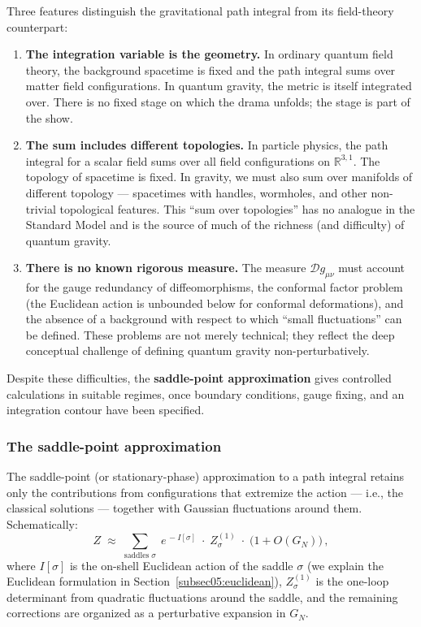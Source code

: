 \documentclass[11pt,letterpaper]{article}
\theoremstyle{plain}
\theoremstyle{definition}
\theoremstyle{remark}
\begin{document}
Three features distinguish the gravitational path integral from its field-theory
counterpart:

\begin{enumerate}
  \item \textbf{The integration variable is the geometry.}  In ordinary quantum
    field theory, the background spacetime is fixed and the path integral sums
    over matter field configurations.  In quantum gravity, the metric is itself
    integrated over.  There is no fixed stage on which the drama unfolds; the
    stage is part of the show.

  \item \textbf{The sum includes different topologies.}  In particle physics, the
    path integral for a scalar field sums over all field configurations on
    $\mathbb{R}^{3,1}$.  The topology of spacetime is fixed.  In gravity, we must
    also sum over manifolds of different topology --- spacetimes with handles,
    wormholes, and other non-trivial topological features.  This ``sum over
    topologies'' has no analogue in the Standard Model and is the source of much
    of the richness (and difficulty) of quantum gravity.

  \item \textbf{There is no known rigorous measure.}  The measure
    $\mathcal{D}g_{\mu\nu}$ must account for the gauge redundancy of
    diffeomorphisms, the conformal factor problem (the Euclidean action is
    unbounded below for conformal deformations), and the absence of a background
    with respect to which ``small fluctuations'' can be defined.  These problems
    are not merely technical; they reflect the deep conceptual challenge of
    defining quantum gravity non-perturbatively.
\end{enumerate}

Despite these difficulties, the \textbf{saddle-point approximation} gives
controlled calculations in suitable regimes, once boundary conditions,
gauge fixing, and an integration contour have been specified.

\subsubsection*{The saddle-point approximation}

The saddle-point (or stationary-phase) approximation to a path integral retains
only the contributions from configurations that extremize the action --- i.e., the
classical solutions --- together with Gaussian fluctuations around them.
Schematically:
\begin{equation}\label{eq05:saddle_point}
  Z \;\approx\; \sum_{\text{saddles}\;\sigma}\;
  e^{\,-I[\sigma]}\;\cdot\;
  Z^{(1)}_{\sigma}\;\cdot\;
  \bigl(1 + O(G_N)\bigr)\,,
\end{equation}
where $I[\sigma]$ is the on-shell Euclidean action of the saddle $\sigma$ (we
explain the Euclidean formulation in Section~\ref{subsec05:euclidean}),
$Z^{(1)}_\sigma$ is the one-loop determinant from quadratic fluctuations around
the saddle, and the remaining corrections are organized as a perturbative
expansion in $G_N$.
\end{document}
